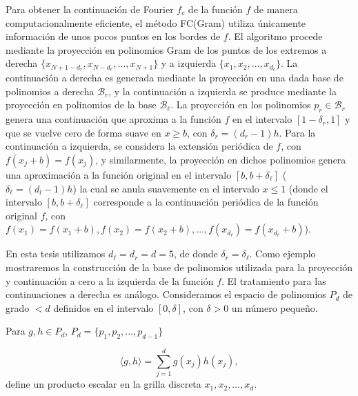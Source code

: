 Para obtener la continuación de Fourier $f_c$ de la función $f$ de manera computacionalmente eficiente, el método FC(Gram) utiliza únicamente información de unos pocos puntos en los bordes de $f$. 
El algoritmo procede mediante la proyección en polinomios Gram de los puntos de los extremos 
a derecha $\{x_{N+1-d_r},x_{N-d_r},\ldots, x_{N+1} \}$ y a izquierda $\{x_{1},x_{2},\ldots, x_{d_{\ell}} \}$.
La continuación a derecha es generada mediante la proyección en una dada base de polinomios 
a derecha $\mathcal{B}_r$, y la continuación a izquierda se produce mediante la proyección 
en polinomios de la base $\mathcal{B}_{\ell}$. 
La proyección en los polinomios $p_r \in \mathcal{B}_r$ genera una continuación que 
aproxima a la función $f$ en el intervalo $[1-\delta_r,1]$ y que se vuelve cero de 
forma suave en $x\ge b$, con $\delta_r=(d_r-1)h$. Para la continuación a izquierda, se considera 
la extensión periódica de $f$, con $f(x_j+b)=f(x_j)$, y similarmente, la proyección 
en dichos polinomios genera una aproximación a la función original en el intervalo $[b,b+\delta_{\ell}]$ ($\delta_{\ell}=(d_l-1)h$) la cual se anula suavemente en el intervalo $x\leq 1$ (donde el 
intervalo $[b,b+\delta_{\ell}]$ corresponde a la continuación periódica de la función original $f$, con $f(x_1)=f(x_1+b),f(x_2)=f(x_2+b),\ldots, f(x_{d_{\ell}})=f(x_{d_{\ell}}+b)$). 

En esta tesis utilizamos $d_{\ell}=d_r=d=5$, de donde $\delta_r=\delta_{\ell}$.  
Como ejemplo mostraremos la construcción de la base 
de polinomios utilizada para la proyección y continuación a cero 
a la izquierda de la función $f$. El tratamiento para las continuaciones a derecha 
es análogo.
Consideramos el espacio de polinomios $P_d$ de grado $<d$ definidos en el intervalo $[0,\delta]$, con $\delta>0$ un número pequeño.

Para $g,h\in P_d$, $P_d=\{p_1,p_2,...,p_{d-1}\}$

\begin{equation}
\langle g,h\rangle =\sum_{j=1}^{d}g(x_j)h(x_j),
\label{eq:dotpd}
\end{equation}
define un producto escalar en la grilla discreta $x_1,x_2,\ldots,x_d$.

